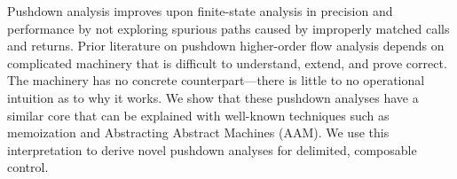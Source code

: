 Pushdown analysis improves upon finite-state analysis in precision and performance by not exploring spurious paths caused by improperly matched calls and returns.
%
Prior literature on pushdown higher-order flow analysis depends on complicated machinery that is difficult to understand, extend, and prove correct.
%
The machinery has no concrete counterpart---there is little to no operational intuition as to why it works.
%
We show that these pushdown analyses have a similar core that can be explained with well-known techniques such as memoization and Abstracting Abstract Machines (AAM).
%
We use this interpretation to derive novel pushdown analyses for delimited, composable control.
